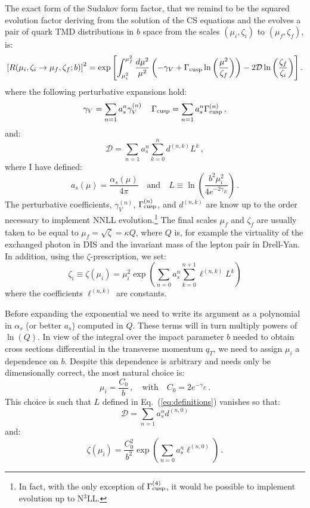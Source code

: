 \documentclass[10pt,a4paper]{article}
\begin{document}
The exact form of the Sudakov form factor, that we remind to be the
squared evolution factor deriving from the solution of the CS
equations and the evolves a pair of quark TMD distributions in $b$
space from the scales $(\mu_i,\zeta_i)$ to $(\mu_f,\zeta_f)$, is:
\begin{equation}\label{eq:sudakov}
\left[R(\mu_i,\zeta_i\rightarrow
  \mu_f,\zeta_f;b)\right]^2=\exp\left[\int_{\mu_i^2}^{\mu_f^2}\frac{d\mu^2}{\mu^2}\left(-\gamma_V+\Gamma_{\rm
    cusp}\ln\left(\frac{\mu^2}{\zeta_f}\right)\right)-2\mathcal{D}\ln\left(\frac{\zeta_f}{\zeta_i}\right)\right].
\end{equation}
where the following perturbative expansions hold:
\begin{equation}
\gamma_V = \sum_{n=1}a_s^n
\gamma_V^{(n)}\,\quad \Gamma_{\rm cusp} =
\sum_{n=1}a_s^n \Gamma_{\rm cusp}^{(n)}\,,
\end{equation}
and:
\begin{equation}
\mathcal{D} =
\sum_{n=1}a_s^{n}\sum_{k=0}^n d^{(n,k)}L^k\,,
\end{equation}
where I have defined:
\begin{equation}\label{eq:definitions}
  a_s(\mu) = \frac{\alpha_s(\mu)}{4\pi}\quad\mbox{and}\quad L\equiv \ln\left(\frac{b^2\mu_i^2}{4e^{-2\gamma_E}}\right)\,.
\end{equation}
The perturbative coefficients, $\gamma_V^{(n)}$,
$\Gamma_{\rm cusp}^{(n)}$, and $d^{(n,k)}$ are know up to the order
necessary to implement NNLL evolution.\footnote{In fact, with the only
  exception of $\Gamma_{\rm cusp}^{(4)}$, it would be possible to
  implement evolution up to N$^3$LL.} The final scales $\mu_f$ and
$\zeta_f$ are usually taken to be equal to
$\mu_f=\sqrt{\zeta}=\kappa Q$, where $Q$ is, for example the
virtuality of the exchanged photon in DIS and the invariant mass of
the lepton pair in Drell-Yan. In addition, using the
$\zeta$-prescription, we set:
\begin{equation}
\zeta_i \equiv \zeta(\mu_i) = \mu_i^2
\exp\left(\sum_{n=0}a_s^n\sum_{k=0}^{n+1}\ell^{(n,k)}L^k\right)
\end{equation}
where the coefficients $\ell^{(n,k)}$ are constants.

Before expanding the exponential we need to write its argument as a
polynomial in $\alpha_s$ (or better $a_s$) computed in $Q$. These
terms will in turn multiply powers of $\ln(Q)$. In view of the
integral over the impact parameter $b$ needed to obtain cross sections
differential in the transverse momentum $q_T$, we need to assign
$\mu_i$ a dependence on $b$. Despite this dependence is arbitrary and
needs only be dimensionally correct, the most natural choice is:
\begin{equation}
  \mu_i=\frac{C_0}{b}\,,\quad\mbox{with}\quad C_0=2e^{-\gamma_E}\,.
\end{equation}
This choice is such that $L$ defined in Eq.~(\ref{eq:definitions})
vanishes so that:
\begin{equation}
  \mathcal{D} =
  \sum_{n=1}a_s^{n}d^{(n,0)}
\end{equation}
and:
\begin{equation}
\zeta(\mu_i) =\frac{C_0^2}{b^2}
\exp\left(\sum_{n=0}a_s^n\ell^{(n,0)}\right)\,.
\end{equation}
\end{document}
